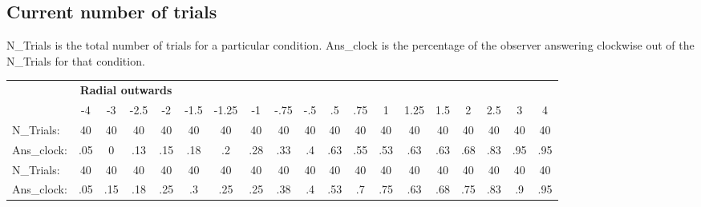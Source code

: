 \documentclass[11pt]{article} %
\begin{document}
\newpage
\subsection{Current number of trials}
N\_Trials is the total number of trials for a particular condition.
Ans\_clock is the percentage of the observer answering clockwise out of the N\_Trials for that condition.
\begin{table}[htb]
  \label{tbl:stats-and-correlations}
  \small\begin{tabular*}{\linewidth}{l@{\extracolsep{\fill}}*{18}{c}}
    \toprule
    & \multicolumn{4}{c}{\textbf{Radial outwards}}\\ \cmidrule(r){2-18}
    & {-4} & {-3} & {-2.5} & {-2} & {-1.5} & {-1.25} & {-1} & {-.75} & {-.5} & {.5} & {.75} & {1} & {1.25} & {1.5} & {2} & {2.5}& {3}& {4} \\ [0.5ex]
    N\_Trials:  &    40 &    40 &    40 &    40 &    40 &    40 &    40&   40 &   40 &    40&    40&    40&   40&    40&    40 & 40 & 40 & 40\\
    Ans\_clock:  &  .05 &  0 &    .13 &    .15 &    .18 &    .2 &    .28 &   .33 &    .4&    .63&    .55&    .53&    .63&    .63&    .68&    .83 & .95 & .95\\
    N\_Trials:  &    40 &    40 &    40 &    40 &    40 &    40 &    40&   40 &   40 &    40&    40&    40&   40&    40&    40 & 40 & 40 & 40\\
    Ans\_clock:  &  .05 &  .15 &    .18 &   .25 &    .3 &    .25 &   .25 &    .38&    .4&    .53&    .7&    .75&    .63&    .68&    .75 & .83 & .9 & .95\\
    \bottomrule
  \end{tabular*}
\end{table}
\end{document}

